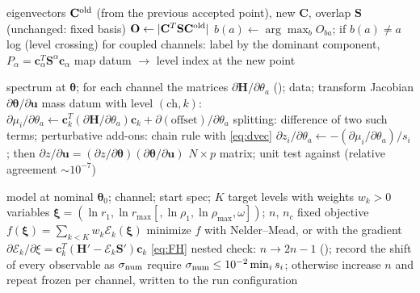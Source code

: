 \documentclass[11pt,a4paper]{article}
\numberwithin{equation}{section}
\theoremstyle{definition}
\theoremstyle{plain}
\theoremstyle{remark}
\numberwithin{algorithm}{section}
\newcommand{\mH}{\mathbf H}
\newcommand{\mS}{\mathbf S}
\newcommand{\vc}{\bm c}
\newcommand{\vth}{\bm\theta}
\begin{document}
\begin{algorithm}[H]
\caption{Label levels and track them between parameter points}\label{alg:track}
\begin{algorithmic}[1]
\Require eigenvectors $\mathbf C^{\rm old}$ (from the previous accepted point), new $\mathbf C$, overlap $\mS$ (unchanged: fixed basis)
\State $\mathbf O\gets|\mathbf C^T\mS\mathbf C^{\rm old}|$ 
  \State $b(a)\gets\arg\max_bO_{ba}$; if $b(a)\ne a$ log  (level crossing)
\EndFor
\State for coupled channels: label by the dominant component, $P_\alpha=\vc_\alpha^T\mS^\alpha\vc_\alpha$
\Ensure map datum $\to$ level index at the new point
\end{algorithmic}
\end{algorithm}

\begin{algorithm}[H]
\caption{Feynman--Hellmann Jacobian of the whitened residuals}\label{alg:fh}
\begin{algorithmic}[1]
\Require spectrum at $\vth$; for each channel the matrices $\partial\mH/\partial\theta_a$ (); data; transform Jacobian $\partial\vth/\partial\bm u$
  \State mass datum with level $(\text{ch},k)$: $\partial\mu_i/\partial\theta_a\gets\vc_k^T(\partial\mH/\partial\theta_a)\vc_k+\partial(\text{offset})/\partial\theta_a$ \Comment{$\mS'=0$}
  \State splitting: difference of two such terms; perturbative add-ons: chain rule with \eqref{eq:dvec}
\EndFor
\State $\partial z_i/\partial\theta_a\gets-(\partial\mu_i/\partial\theta_a)/s_i$; then $\partial z/\partial\bm u=(\partial z/\partial\vth)(\partial\vth/\partial\bm u)$
\Ensure $N\times p$ matrix; unit test against  (relative agreement $\sim10^{-7}$)
\end{algorithmic}
\end{algorithm}

\begin{algorithm}[H]
\caption{Basis hyperparameter optimization and convergence check}\label{alg:hyper}
\begin{algorithmic}[1]
\Require model at nominal $\vth_0$; channel; start spec; $K$ target levels with weights $w_k>0$
\State variables $\bm\xi=(\ln r_1,\ln r_{\max}[,\ln\rho_1,\ln\rho_{\max},\omega])$; $n$, $n_c$ fixed 
\State objective $f(\bm\xi)=\sum_{k<K}w_k\mathcal E_k(\bm\xi)$ 
\State minimize $f$ with Nelder--Mead, or with the gradient $\partial\mathcal E_k/\partial\xi=\vc_k^T(\mH'-\mathcal E_k\mS')\vc_k$ \eqref{eq:FH}
\State nested check: $n\to2n-1$ (); record the shift of every observable as $\sigma_{\rm num}$
\State require $\sigma_{\rm num}\le10^{-2}\min_is_i$; otherwise increase $n$ and repeat
\Ensure frozen  per channel, written to the run configuration
\end{algorithmic}
\end{algorithm}
\end{document}
